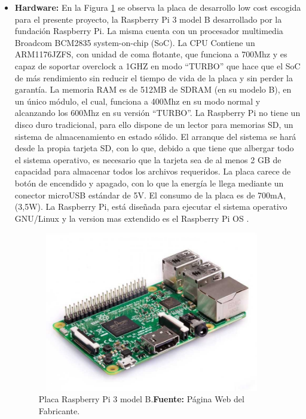 \begin{itemize}
    \item \textbf{Hardware:}
    En la Figura \ref{fig:4.4} se observa la placa de desarrollo low cost escogida para el presente proyecto, la Raspberry Pi 3 model B desarrollado por la fundación Raspberry Pi. La misma cuenta con un procesador multimedia Broadcom BCM2835 system-on-chip (SoC).
    \newline
    \hfill
    La CPU Contiene un ARM1176JZFS, con unidad de coma flotante, que funciona a 700Mhz y es capaz de soportar overclock a 1GHZ en modo “TURBO” que hace que el SoC de más rendimiento sin reducir el tiempo de vida de la placa y sin perder la garantía. 
    La memoria RAM es de 512MB de SDRAM (en su modelo B), en un único módulo, el cual, funciona a 400Mhz en su modo normal y alcanzando los 600Mhz en su versión “TURBO”.
    La  Raspberry Pi no tiene un disco duro tradicional, para ello dispone de un lector para memorias SD, un sistema de almacenamiento en estado sólido. El arranque del sistema se hará desde la propia tarjeta SD, con lo que, debido a que tiene que albergar todo el sistema operativo, es necesario que la tarjeta sea de al menos 2 GB de capacidad para almacenar todos los archivos requeridos.
    La placa carece de botón de encendido y apagado, con lo que la energía le llega mediante un conector microUSB estándar de 5V. El consumo de la placa es de 700mA, (3,5W).
    La Raspberry Pi, está diseñada para ejecutar el sistema operativo GNU/Linux y la version mas extendido es el Raspberry Pi OS .
    \begin{figure}[t]
        \centering
        \includegraphics[width=100mm, height=70mm]{Imagenes/2021/imag35.jpg}
        \caption[Placa Raspberry Pi 3 model B]{Placa Raspberry Pi 3 model B.\textbf{Fuente:} Página Web del Fabricante.}
        \label{fig:4.4}
    \end{figure}


\end{itemize}
